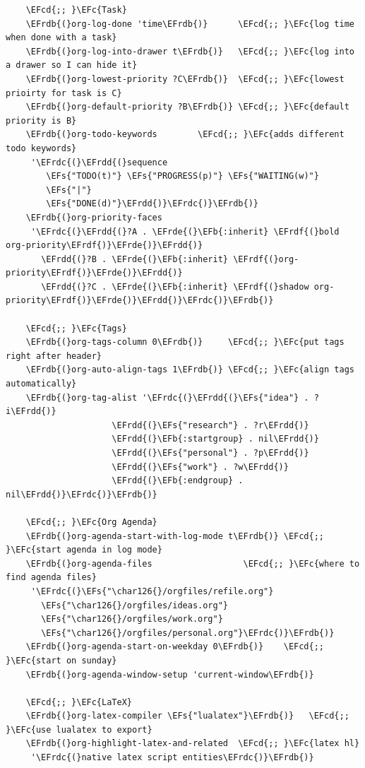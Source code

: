 \documentclass[11pt]{article}
\newcommand{\EFc}[1]{\textcolor{EFc}{#1}} %
\newcommand{\EFcd}[1]{\textcolor{EFcd}{#1}} %
\newcommand{\EFs}[1]{\textcolor{EFs}{#1}} %
\newcommand{\EFb}[1]{\textcolor{EFb}{#1}} %
\newcommand{\EFrdb}[1]{\textcolor{EFrdb}{#1}} %
\newcommand{\EFrdc}[1]{\textcolor{EFrdc}{#1}} %
\newcommand{\EFrdd}[1]{\textcolor{EFrdd}{#1}} %
\newcommand{\EFrde}[1]{\textcolor{EFrde}{#1}} %
\newcommand{\EFrdf}[1]{\textcolor{EFrdf}{#1}} %
\begin{document}
\begin{Code}
\begin{Verbatim}
    \EFcd{;; }\EFc{Task}
    \EFrdb{(}org-log-done 'time\EFrdb{)}      \EFcd{;; }\EFc{log time when done with a task}
    \EFrdb{(}org-log-into-drawer t\EFrdb{)}   \EFcd{;; }\EFc{log into a drawer so I can hide it}
    \EFrdb{(}org-lowest-priority ?C\EFrdb{)}  \EFcd{;; }\EFc{lowest prioirty for task is C}
    \EFrdb{(}org-default-priority ?B\EFrdb{)} \EFcd{;; }\EFc{default priority is B}
    \EFrdb{(}org-todo-keywords        \EFcd{;; }\EFc{adds different todo keywords}
     '\EFrdc{(}\EFrdd{(}sequence
        \EFs{"TODO(t)"} \EFs{"PROGRESS(p)"} \EFs{"WAITING(w)"}
        \EFs{"|"}
        \EFs{"DONE(d)"}\EFrdd{)}\EFrdc{)}\EFrdb{)}
    \EFrdb{(}org-priority-faces
     '\EFrdc{(}\EFrdd{(}?A . \EFrde{(}\EFb{:inherit} \EFrdf{(}bold org-priority\EFrdf{)}\EFrde{)}\EFrdd{)}
       \EFrdd{(}?B . \EFrde{(}\EFb{:inherit} \EFrdf{(}org-priority\EFrdf{)}\EFrde{)}\EFrdd{)}
       \EFrdd{(}?C . \EFrde{(}\EFb{:inherit} \EFrdf{(}shadow org-priority\EFrdf{)}\EFrde{)}\EFrdd{)}\EFrdc{)}\EFrdb{)}

    \EFcd{;; }\EFc{Tags}
    \EFrdb{(}org-tags-column 0\EFrdb{)}     \EFcd{;; }\EFc{put tags right after header}
    \EFrdb{(}org-auto-align-tags 1\EFrdb{)} \EFcd{;; }\EFc{align tags automatically}
    \EFrdb{(}org-tag-alist '\EFrdc{(}\EFrdd{(}\EFs{"idea"} . ?i\EFrdd{)}
                     \EFrdd{(}\EFs{"research"} . ?r\EFrdd{)}
                     \EFrdd{(}\EFb{:startgroup} . nil\EFrdd{)}
                     \EFrdd{(}\EFs{"personal"} . ?p\EFrdd{)}
                     \EFrdd{(}\EFs{"work"} . ?w\EFrdd{)}
                     \EFrdd{(}\EFb{:endgroup} . nil\EFrdd{)}\EFrdc{)}\EFrdb{)}

    \EFcd{;; }\EFc{Org Agenda}
    \EFrdb{(}org-agenda-start-with-log-mode t\EFrdb{)} \EFcd{;; }\EFc{start agenda in log mode}
    \EFrdb{(}org-agenda-files                  \EFcd{;; }\EFc{where to find agenda files}
     '\EFrdc{(}\EFs{"\char126{}/orgfiles/refile.org"}
       \EFs{"\char126{}/orgfiles/ideas.org"}
       \EFs{"\char126{}/orgfiles/work.org"}
       \EFs{"\char126{}/orgfiles/personal.org"}\EFrdc{)}\EFrdb{)}
    \EFrdb{(}org-agenda-start-on-weekday 0\EFrdb{)}    \EFcd{;; }\EFc{start on sunday}
    \EFrdb{(}org-agenda-window-setup 'current-window\EFrdb{)}

    \EFcd{;; }\EFc{LaTeX}
    \EFrdb{(}org-latex-compiler \EFs{"lualatex"}\EFrdb{)}   \EFcd{;; }\EFc{use lualatex to export}
    \EFrdb{(}org-highlight-latex-and-related  \EFcd{;; }\EFc{latex hl}
     '\EFrdc{(}native latex script entities\EFrdc{)}\EFrdb{)}
  

\end{Verbatim}
\end{Code}
\end{document}
